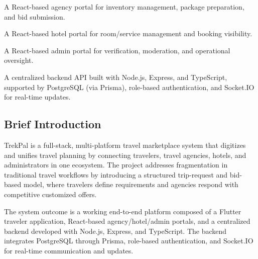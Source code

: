 \documentclass[12pt,a4paper]{article}
\newlength{\ThesisParagraphIndent}
\newcommand{\ThesisParagraph}[1]{%
  \par\begingroup
  \setlength{\leftskip}{\ThesisParagraphIndent}%
  \setlength{\parindent}{0pt}%
  \noindent#1\par
  \endgroup}
\begin{document}
\begin{list}{}{\setlength{\leftmargin}{\dimexpr\ThesisParagraphIndent+1.5em\relax}\setlength{\labelsep}{0.5em}\setlength{\topsep}{2pt}\setlength{\parsep}{0pt}}
\item[\textbullet] A React-based agency portal for inventory management, package preparation, and bid submission.
\end{list}


\begin{list}{}{\setlength{\leftmargin}{\dimexpr\ThesisParagraphIndent+1.5em\relax}\setlength{\labelsep}{0.5em}\setlength{\topsep}{2pt}\setlength{\parsep}{0pt}}
\item[\textbullet] A React-based hotel portal for room/service management and booking visibility.
\end{list}


\begin{list}{}{\setlength{\leftmargin}{\dimexpr\ThesisParagraphIndent+1.5em\relax}\setlength{\labelsep}{0.5em}\setlength{\topsep}{2pt}\setlength{\parsep}{0pt}}
\item[\textbullet] A React-based admin portal for verification, moderation, and operational oversight.
\end{list}


\begin{list}{}{\setlength{\leftmargin}{\dimexpr\ThesisParagraphIndent+1.5em\relax}\setlength{\labelsep}{0.5em}\setlength{\topsep}{2pt}\setlength{\parsep}{0pt}}
\item[\textbullet] A centralized backend API built with Node.js, Express, and TypeScript, supported by PostgreSQL (via Prisma), role-based authentication, and Socket.IO for real-time updates.
\end{list}


\subsection{Brief Introduction}

\ThesisParagraph{TrekPal is a full-stack, multi-platform travel marketplace system that digitizes and unifies travel planning by connecting travelers, travel agencies, hotels, and administrators in one ecosystem. The project addresses fragmentation in traditional travel workflows by introducing a structured trip-request and bid-based model, where travelers define requirements and agencies respond with competitive customized offers.}


\ThesisParagraph{The system outcome is a working end-to-end platform composed of a Flutter traveler application, React-based agency/hotel/admin portals, and a centralized backend developed with Node.js, Express, and TypeScript. The backend integrates PostgreSQL through Prisma, role-based authentication, and Socket.IO for real-time communication and updates.}
\end{document}
